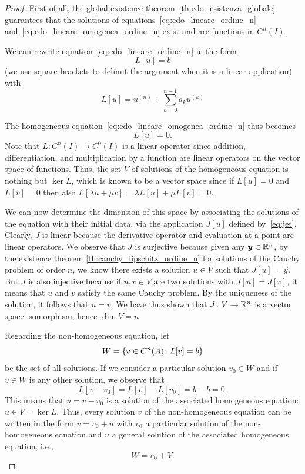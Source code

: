 \begin{proof}
\mymark{***}
First of all, the global existence theorem~\ref{th:edo_esistenza_globale}
guarantees that
the solutions of equations~\eqref{eq:edo_lineare_ordine_n}
and~\eqref{eq:edo_lineare_omogenea_ordine_n} exist and are functions in
$C^n(I)$.

We can rewrite equation~\eqref{eq:edo_lineare_ordine_n} in the form
\[
  L[u] = b
\]
(we use square brackets to delimit the argument when it is a linear application)
with
\[
  L[u] = u^{(n)} + \sum_{k=0}^{n-1} a_k u^{(k)}
\]

The homogeneous equation~\eqref{eq:edo_lineare_omogenea_ordine_n}
thus becomes
\[
  L[u] = 0.
\]
Note that $L\colon C^n(I) \to C^0(I)$ is a linear operator since
addition, differentiation, and multiplication by a function are linear operators
on the vector space of functions.
Thus, the set $V$ of solutions of the homogeneous equation is nothing but
$\ker L$, which is known to be a vector space since if $L[u]=0$ and $L[v]=0$
then also $L[\lambda u + \mu v] = \lambda L[u] + \mu L[v] = 0$.

We can now determine the dimension of this space by associating the solutions of
the equation with their initial data,
via the application $J[u]$ defined by~\eqref{eq:jet}.
Clearly, $J$ is linear because the derivative operator and evaluation at a
point are linear operators. We observe that $J$ is surjective because given any
$\boldsymbol y\in {\mathbb R}^n$, by the existence theorem \ref{th:cauchy_lipschitz_ordine_n}
for solutions of the Cauchy problem of order $n$, we know there exists a
solution $u\in V$ such that $J[u]=\vec y$. But $J$ is also
injective because if $u,v\in V$ are two solutions with $J[u]=J[v]$, it means
that $u$ and $v$ satisfy the same Cauchy problem.
By the uniqueness of the solution, it follows that $u=v$.
We have thus shown that $J\colon V \to {\mathbb R}^n$ is a vector space isomorphism,
hence $\dim V=n$.

Regarding the non-homogeneous equation,
let
\[
W = {\left\{ v\in C^n(A)\colon L[v] = b \right\}}
\]
be the set of all solutions.
If we consider a particular solution $v_0\in W$ and if $v\in W$ is any
other solution, we observe that
\[
  L[v-v_0] = L[v] - L[v_0] = b-b = 0.
\]
This means that $u=v-v_0$ is a solution of the associated homogeneous equation:
$u\in V=\ker L$.
Thus, every solution $v$ of the non-homogeneous equation can be written in the
form $v = v_0 + u$ with $v_0$ a particular solution of the non-homogeneous
equation and
$u$ a general solution of the associated homogeneous equation, i.e.,
\[
  W = v_0 + V.
\]
\end{proof}

